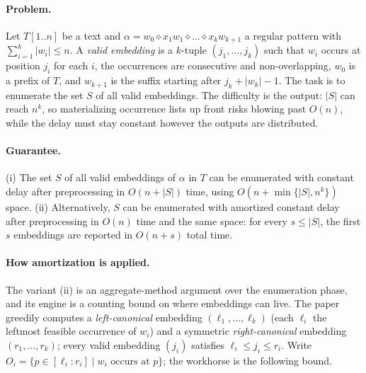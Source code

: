 \paragraph{Problem.}
Let $T[1..n]$ be a text and $\alpha = w_0 \diamond x_1 w_1 \diamond \dots
\diamond x_k w_{k+1}$ a regular pattern with $\sum_{i=1}^{k} |w_i| \le n$. A
\emph{valid embedding} is a $k$-tuple $(j_1, \dots, j_k)$ such that $w_i$
occurs at position $j_i$ for each $i$, the occurrences are consecutive and
non-overlapping, $w_0$ is a prefix of $T$, and $w_{k+1}$ is the suffix
starting after $j_k + |w_k| - 1$. The task is to enumerate the set $S$ of all
valid embeddings. The difficulty is the output: $|S|$ can reach $n^k$, so
materializing occurrence lists up front risks blowing past $O(n)$, while the
delay must stay constant however the outputs are distributed.

\paragraph{Guarantee.}

\begin{theorem}\label{thm:amo-enum}
(i) The set $S$ of all valid embeddings of $\alpha$ in $T$ can be enumerated
with constant delay after preprocessing in $O(n + |S|)$ time, using
$O(n + \min\{|S|, n^k\})$ space. (ii) Alternatively, $S$ can be enumerated
with amortized constant delay after preprocessing in $O(n)$ time and the same
space: for every $s \le |S|$, the first $s$ embeddings are reported in
$O(n + s)$ total time. \eop
\end{theorem}

\paragraph{How amortization is applied.}
The variant (ii) is an aggregate-method argument over the enumeration phase,
and its engine is a counting bound on where embeddings can live. The paper
greedily computes a \emph{left-canonical} embedding $(\ell_1, \dots, \ell_k)$
(each $\ell_i$ the leftmost feasible occurrence of $w_i$) and a symmetric
\emph{right-canonical} embedding $(r_1, \dots, r_k)$; every valid embedding
$(j_i)$ satisfies $\ell_i \le j_i \le r_i$. Write $O_i = \{p \in [\ell_i :
r_i] \mid w_i \text{ occurs at } p\}$; the workhorse is the following bound.

